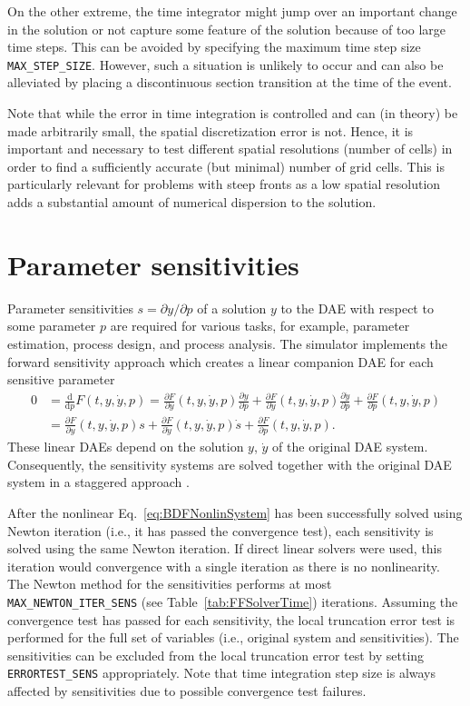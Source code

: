 On the other extreme, the time integrator might jump over an important change in the solution or not capture some feature of the solution because of too large time steps.
This can be avoided by specifying the maximum time step size \texttt{MAX\_STEP\_SIZE}.
However, such a situation is unlikely to occur and can also be alleviated by placing a discontinuous section transition at the time of the event.

Note that while the error in time integration is controlled and can (in theory) be made arbitrarily small, the spatial discretization error is not.
Hence, it is important and necessary to test different spatial resolutions (number of cells) in order to find a sufficiently accurate (but minimal) number of grid cells.
This is particularly relevant for problems with steep fronts as a low spatial resolution adds a substantial amount of numerical dispersion to the solution.

\section{Parameter sensitivities}\label{sec:SimParamSens}

Parameter sensitivities $s = \partial y / \partial p$  of a solution $y$ to the DAE with respect to some parameter $p$ are required for various tasks, for example, parameter estimation, process design, and process analysis.
The \CADET{} simulator implements the forward sensitivity approach which creates a linear companion DAE for each sensitive parameter
\begin{align*}
	0 &= \frac{\mathrm{d}}{\mathrm{d}p} F(t, y, \dot{y}, p) = \frac{\partial F}{\partial y}(t, y, \dot{y}, p) \frac{\partial y}{\partial p} + \frac{\partial F}{\partial \dot{y}}(t, y, \dot{y}, p) \frac{\partial \dot{y}}{\partial p} + \frac{\partial F}{\partial p}(t, y, \dot{y}, p) \\
	&= \frac{\partial F}{\partial y}(t, y, \dot{y}, p) s + \frac{\partial F}{\partial \dot{y}}(t, y, \dot{y}, p) \dot{s} + \frac{\partial F}{\partial p}(t, y, \dot{y}, p).
\end{align*}
These linear DAEs depend on the solution $y$, $\dot{y}$ of the original DAE system.
Consequently, the sensitivity systems are solved together with the original DAE system in a staggered approach \cite{Feehery1997}.

After the nonlinear Eq.~\eqref{eq:BDFNonlinSystem} has been successfully solved using Newton iteration (i.e., it has passed the convergence test), each sensitivity is solved using the same Newton iteration.
If direct linear solvers were used, this iteration would convergence with a single iteration as there is no nonlinearity.
The Newton method for the sensitivities performs at most \texttt{MAX\_NEWTON\_ITER\_SENS} (see Table~\ref{tab:FFSolverTime}) iterations.
Assuming the convergence test has passed for each sensitivity, the local truncation error test is performed for the full set of variables (i.e., original system and sensitivities).
The sensitivities can be excluded from the local truncation error test by setting \texttt{ERRORTEST\_SENS} appropriately.
Note that time integration step size is always affected by sensitivities due to possible convergence test failures.

